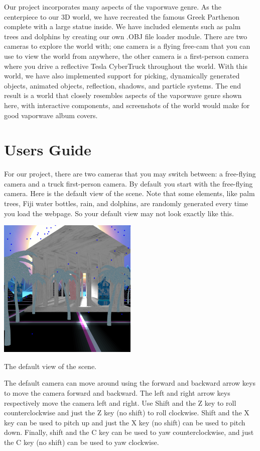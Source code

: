 \documentclass[10pt,letterpaper,oneside]{article}
\numberwithin{equation}{section}		%
\numberwithin{figure}{section}			%
\numberwithin{table}{section}				%
\begin{document}
Our project incorporates many aspects of the vaporwave genre. As the centerpiece to our 3D world, we have recreated the famous Greek Parthenon complete with a large statue inside. We have included elements such as palm trees and dolphins by creating our own .OBJ file loader module. There are two cameras to explore the world with; one camera is a flying free-cam that you can use to view the world from anywhere, the other camera is a first-person camera where you drive a reflective Tesla CyberTruck throughout the world. With this world, we have also implemented support for picking, dynamically generated objects, animated objects, reflection, shadows, and particle systems. The end result is a world that closely resembles aspects of the vaporwave genre shown here, with interactive components, and screenshots of the world would make for good vaporwave album covers.

\newpage
\section{Users Guide}

For our project, there are two cameras that you may switch between: a free-flying camera and a truck first-person camera. By default you start with the free-flying camera. Here is the default view of the scene. Note that some elements, like palm trees, Fiji water bottles, rain, and dolphins, are randomly generated every time you load the webpage. So your default view may not look exactly like this.
\begin{center}
    \includegraphics[width=0.5\textwidth]{start.png}
    
    The default view of the scene.
\end{center}

The default camera can move around using the forward and backward arrow keys to move the camera forward and backward. The left and right arrow keys respectively move the camera left and right. Use Shift and the Z key to roll counterclockwise and just the Z key (no shift) to roll clockwise. Shift and the X key can be used to pitch up and just the X key (no shift) can be used to pitch down. Finally, shift and the C key can be used to yaw counterclockwise, and just the C key (no shift) can be used to yaw clockwise.
\end{document}

